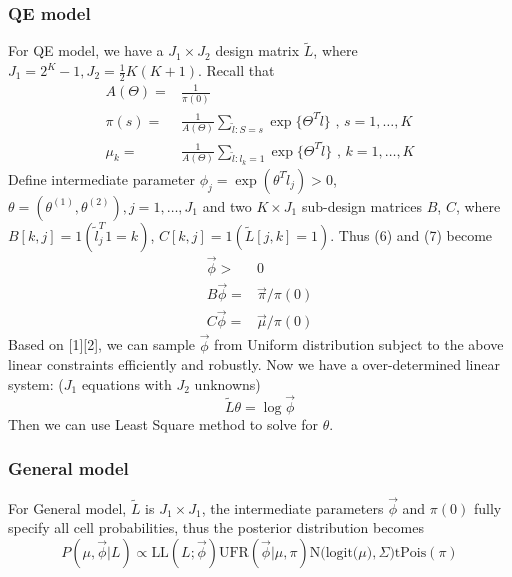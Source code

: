 \documentclass[11 pt, a4paper]{article}  %
\begin{document}
\subsubsection{QE model}
For QE model, we have a $J_1\times J_2$ design matrix $\tilde{L}$, where $J_1 = 2^K-1, J_2 = \frac{1}{2}K(K+1)$. Recall that 
\begin{align}
A(\Theta) = & \frac{1}{\pi(0)} \nonumber \\
\pi(s) = & \frac{1}{A(\Theta)} \sum_{\tilde{l}:S=s}\exp \{ \Theta^T \tilde{l}\}  \text{ , } s = 1,\ldots, K \\
\mu_k = & \frac{1}{A(\Theta)} \sum_{\tilde{l}:l_k=1}\exp \{ \Theta^T \tilde{l}\}  \text{ , } k = 1, \ldots, K
\end{align}
Define intermediate parameter $\phi_j = \exp(\theta^T\tilde{l}_j) >0$, $\theta = (\theta^{(1)},\theta^{(2)}), j= 1, \ldots, J_1$ and two $K \times J_1$ sub-design matrices $B$, $C$, where $B[k,j] = 1(\tilde{l}_j^T 1=k)$, $C[k,j] = 1(\tilde{L}[j,k]=1)$. Thus (6) and (7) become
\begin{align*}
\vec{\phi} > & 0\\
B \vec{\phi} = & \vec{\pi}/\pi(0)\\ 
C \vec{\phi} = & \vec{\mu}/\pi(0)
\end{align*}
Based on [1][2], we can sample $\vec{\phi}$ from Uniform distribution subject to the above linear constraints efficiently and robustly. Now we have a over-determined linear system: ($J_1$ equations with $J_2$ unknowns)
\[\tilde{L}\theta = \log \vec{\phi}\]
Then we can use Least Square method to solve for $\theta$. 

\subsubsection{General model}
For General model, $\tilde{L}$ is $J_1 \times J_1$, the intermediate parameters $\vec{\phi}$ and $\pi(0)$ fully specify all cell probabilities, thus the posterior distribution becomes 
\[ P(\mu, \vec{\phi} |L) \propto \text{LL}(L; \vec{\phi}) \text{UFR}(\vec{\phi} |\mu, \pi ) \text{N(logit(}\mu),\Sigma) \text{tPois}(\pi)\]
%
\end{document}
